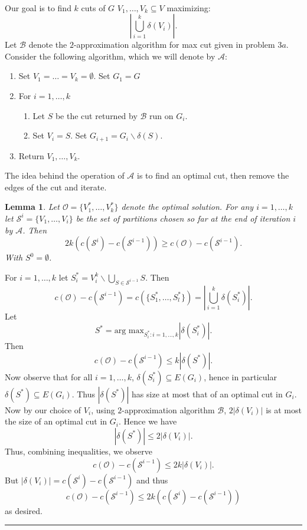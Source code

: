 \documentclass[letterpaper,12pt,oneside,onecolumn]{article}
\newcommand{\cA}{\mathcal{A}} \newcommand{\cB}{\mathcal{B}}
\newcommand{\cO}{\mathcal{O}} \newcommand{\cP}{\mathcal{P}}
\newcommand{\cS}{\mathcal{S}} \newcommand{\cT}{\mathcal{T}}
\newenvironment{proof}{{\bf Proof:  }}{\hfill\rule{2mm}{2mm}}
\newtheorem{lemma}[fact]{Lemma}
\begin{document}
\paragraph{}
Our goal is to find $k$ cuts of $G$ $V_1, \dots, V_k \subseteq V$ maximizing:
$$|\bigcup_{i=1}^k \delta(V_i)|.$$
Let $\cB$ denote the $2$-approximation algorithm for max cut given in problem $3a$. Consider the following algorithm, which we will denote by $\cA$:
\begin{enumerate}
\item Set $V_1 = \dots = V_k = \emptyset$. Set $G_1 = G$
\item For $i = 1, \dots, k$
\begin{enumerate}
\item Let $S$ be the cut returned by $\cB$ run on $G_i$.
\item Set $V_i = S$. Set $G_{i+1} = G_i \backslash \delta(S).$
\end{enumerate}
\item Return $V_1, \dots, V_k$.
\end{enumerate}
The idea behind the operation of $\cA$ is to find an optimal cut, then remove the edges of the cut and iterate.
\begin{lemma}\label{lemma:3b1}
Let $\cO = \{V^*_1, \dots, V^*_k\}$ denote the optimal solution. For any $i=1,\dots, k$ let $\cS^i = \{V_1, \dots, V_{i}\}$ be the set of partitions chosen so far at the end of iteration $i$ by $\cA$. Then 
$$2k(c(\cS^i) - c(\cS^{i-1})) \geq c(\cO) - c(\cS^{i-1}).$$
With $S^0 = \emptyset$.
\end{lemma}
\begin{proof}
For $i = 1,\dots, k$ let $S_i^* = V_i^k \backslash \bigcup_{S\in \cS^{i-1}} S$. Then
$$c(\cO) - c(\cS^{i-1}) = c(\{S^*_1,\dots, S^*_l\}) = |\bigcup_{i=1}^k \delta(S^*_i)|.$$
Let $$S^* = \text{arg max}_{S^*_i : i=1,\dots, k} |\delta(S^*_i)|.$$
Then 
$$c(\cO) - c(\cS^{i-1}) \leq k|\delta(S^*)|.$$
Now observe that for all $i = 1,\dots, k$, $\delta(S^*_i) \subseteq E(G_i)$, hence in particular $\delta(S^*) \subseteq E(G_i)$. Thus $|\delta(S^*)|$ has size at most that of an optimal cut in $G_i$. Now by our choice of $V_i$, using $2$-approximation algorithm $\cB$, $2|\delta(V_i)|$ is at most the size of an optimal cut in $G_i$. Hence we have
$$|\delta(S^*)| \leq 2|\delta(V_i)|.$$
Thus, combining inequalities, we observe
$$c(\cO) - c(\cS^{i-1}) \leq 2k |\delta(V_i)|.$$
But $|\delta(V_i)| = c(\cS^i) - c(\cS^{i-1})$ and thus
$$c(\cO) - c(\cS^{i-1}) \leq 2k (c(\cS^i) - c(\cS^{i-1}))$$
as desired.
\end{proof}
\end{document}
